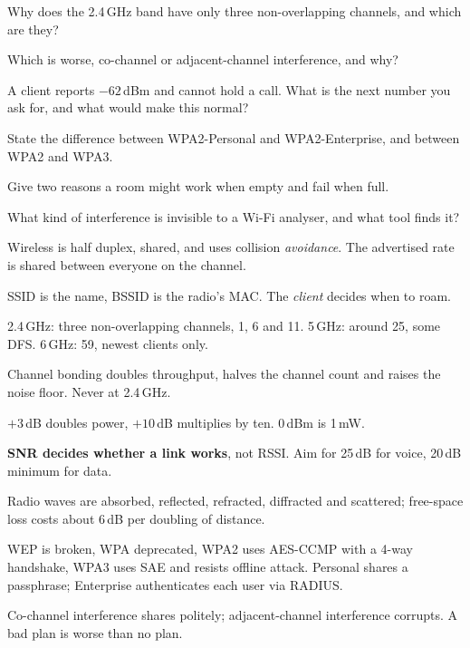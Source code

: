 \begin{checkpoint}
\begin{tightnum}
  \item Why does the 2.4\,GHz band have only three non-overlapping channels, and
        which are they?
  \item Which is worse, co-channel or adjacent-channel interference, and why?
  \item A client reports $-62$\,dBm and cannot hold a call. What is the next
        number you ask for, and what would make this normal?
  \item State the difference between WPA2-Personal and WPA2-Enterprise, and
        between WPA2 and WPA3.
  \item Give two reasons a room might work when empty and fail when full.
  \item What kind of interference is invisible to a Wi-Fi analyser, and what tool
        finds it?
\end{tightnum}
\end{checkpoint}

\begin{chaptersummary}
\begin{tight}
  \item Wireless is half duplex, shared, and uses collision \emph{avoidance}. The
        advertised rate is shared between everyone on the channel.
  \item SSID is the name, BSSID is the radio's MAC. The \emph{client} decides
        when to roam.
  \item 2.4\,GHz: three non-overlapping channels, 1, 6 and 11. 5\,GHz: around 25,
        some DFS. 6\,GHz: 59, newest clients only.
  \item Channel bonding doubles throughput, halves the channel count and raises
        the noise floor. Never at 2.4\,GHz.
  \item $+3$\,dB doubles power, $+10$\,dB multiplies by ten. 0\,dBm is 1\,mW.
  \item \textbf{SNR decides whether a link works}, not RSSI. Aim for 25\,dB for
        voice, 20\,dB minimum for data.
  \item Radio waves are absorbed, reflected, refracted, diffracted and scattered;
        free-space loss costs about 6\,dB per doubling of distance.
  \item WEP is broken, WPA deprecated, WPA2 uses AES-CCMP with a 4-way handshake,
        WPA3 uses SAE and resists offline attack. Personal shares a passphrase;
        Enterprise authenticates each user via RADIUS.
  \item Co-channel interference shares politely; adjacent-channel interference
        corrupts. A bad plan is worse than no plan.
\end{tight}
\end{chaptersummary}

